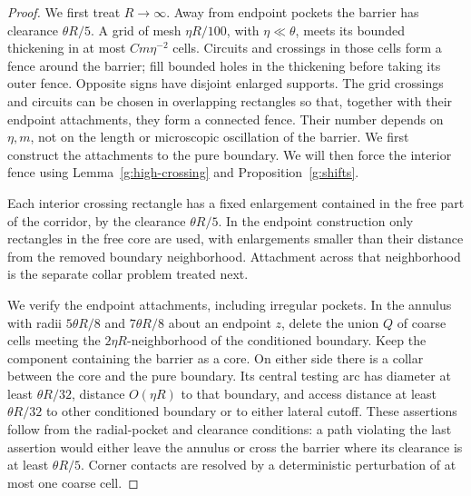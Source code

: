\begin{proof}
We first treat \(R\to\infty\). Away from endpoint pockets the barrier
has clearance \(\theta R/5\). A grid of mesh \(\eta R/100\), with
\(\eta\ll\theta\), meets its bounded thickening in at most
\(C m\eta^{-2}\) cells. Circuits and crossings in those cells form a
fence around the barrier; fill bounded holes in the thickening before
taking its outer fence. Opposite signs have disjoint enlarged supports.
The grid crossings and circuits can be chosen in overlapping rectangles
so that, together with their endpoint attachments, they form a connected
fence. Their number depends on \(\eta,m\), not on the length or
microscopic oscillation of the barrier. We first construct the attachments
to the pure boundary. We will then force the interior fence using
Lemma~\ref{g:high-crossing} and Proposition~\ref{g:shifts}.

Each interior crossing rectangle has a fixed enlargement contained
in the free part of the corridor, by the clearance \(\theta R/5\).
In the endpoint construction only rectangles in the free core are used,
with enlargements smaller than their distance from the removed boundary
neighborhood. Attachment across that neighborhood is the separate
collar problem treated next.

We verify the endpoint attachments, including irregular pockets.
In the annulus with radii \(5\theta R/8\) and \(7\theta R/8\) about
an endpoint \(z\), delete the union \(Q\) of coarse cells meeting the
\(2\eta R\)-neighborhood of the conditioned boundary. Keep the component
containing the barrier as a core. On either side there is a collar
between the core and the pure boundary. Its central testing arc has
diameter at least \(\theta R/32\), distance \(O(\eta R)\) to that
boundary, and access distance at least \(\theta R/32\) to other
conditioned boundary or to either lateral cutoff. These assertions
follow from the radial-pocket and clearance conditions: a path violating
the last assertion would either leave the annulus or cross the barrier
where its clearance is at least \(\theta R/5\). Corner contacts are
resolved by a deterministic perturbation of at most one coarse cell.


\end{proof}
